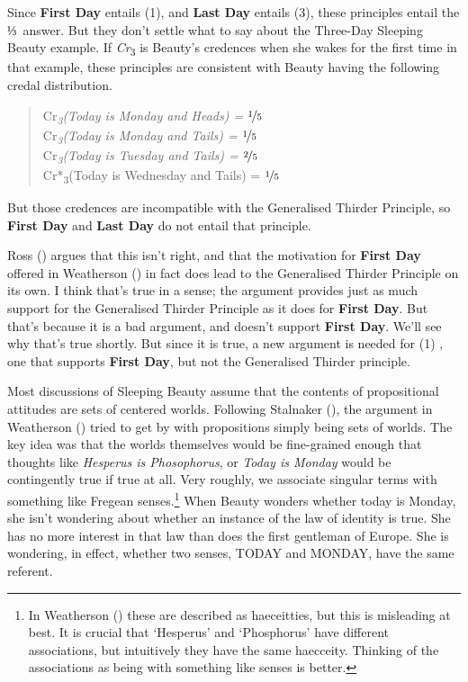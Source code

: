 \documentclass[
  10pt,
  letterpaper,
  DIV=11,
  numbers=noendperiod,
  twoside]{scrartcl}
\begin{document}
Since \textbf{First Day} entails (1), and \textbf{Last Day} entails (3),
these principles entail the ⅓~answer. But they don't settle what to say
about the Three-Day Sleeping Beauty example. If
\emph{Cr}\textsubscript{3} is Beauty's credences when she wakes for the
first time in that example, these principles are consistent with Beauty
having the following credal distribution.

\begin{quote}
\noindent *Cr\emph{\textsubscript{3}(Today is Monday and Heads) =
\(\nicefrac{1}{5}\)~\\
}Cr\emph{\textsubscript{3}(Today is Monday and Tails) =
\(\nicefrac{1}{5}\)~\\
}Cr\emph{\textsubscript{3}(Today is Tuesday and Tails) =
\(\nicefrac{2}{5}\)~\\
}Cr*\textsubscript{3}(Today is Wednesday and Tails) =
\(\nicefrac{1}{5}\)~
\end{quote}

But those credences are incompatible with the Generalised Thirder
Principle, so \textbf{First Day} and \textbf{Last Day} do not entail
that principle.

Ross () argues that this isn't right, and
that the motivation for \textbf{First Day} offered in Weatherson
() in fact does lead to the
Generalised Thirder Principle on its own. I think that's true in a
sense; the argument provides just as much support for the Generalised
Thirder Principle as it does for \textbf{First Day}. But that's because
it is a bad argument, and doesn't support \textbf{First Day}. We'll see
why that's true shortly. But since it is true, a new argument is needed
for (1) , one that supports \textbf{First Day}, but not the Generalised
Thirder principle.

Most discussions of Sleeping Beauty assume that the contents of
propositional attitudes are sets of centered worlds. Following Stalnaker
(), the argument in Weatherson
() tried to get by with propositions
simply being sets of worlds. The key idea was that the worlds themselves
would be fine-grained enough that thoughts like \emph{Hesperus is
Phosophorus}, or \emph{Today is Monday} would be contingently true if
true at all. Very roughly, we associate singular terms with something
like Fregean senses.\footnote{In Weatherson
  () these are described as
  haeceitties, but this is misleading at best. It is crucial that
  `Hesperus' and `Phosphorus' have different associations, but
  intuitively they have the same haecceity. Thinking of the associations
  as being with something like senses is better.} When Beauty wonders
whether today is Monday, she isn't wondering about whether an instance
of the law of identity is true. She has no more interest in that law
than does the first gentleman of Europe. She is wondering, in effect,
whether two senses, TODAY and MONDAY, have the same referent.
\end{document}
